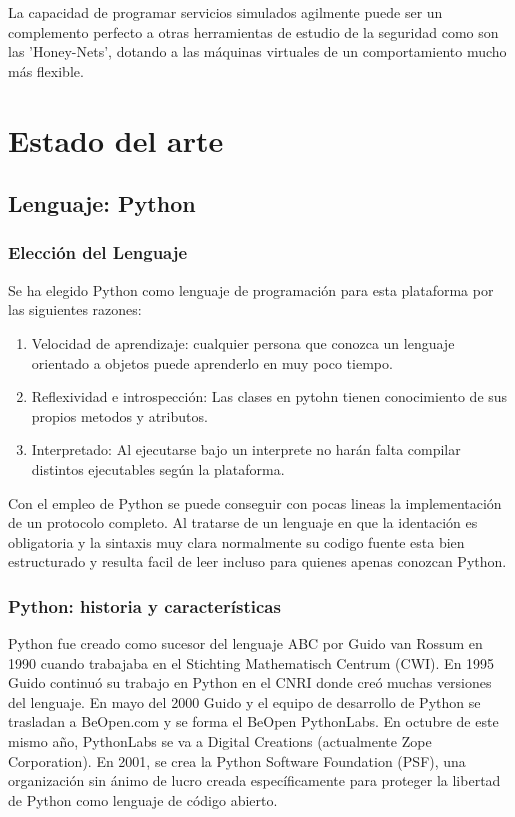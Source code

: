 \documentclass[a4paper,spanish,12pt]{book}
\begin{document}
La capacidad de programar servicios simulados agilmente puede ser un complemento perfecto a otras herramientas de estudio de la seguridad como son las 'Honey-Nets', dotando a las m\'aquinas virtuales de un comportamiento mucho m\'as flexible.



\chapter{Estado del arte}

\section{Lenguaje: Python}
\subsection{Elecci\'on del Lenguaje} 
Se ha elegido Python como lenguaje de programaci\'on para esta plataforma por las siguientes razones:
\begin{enumerate}
	\item Velocidad de aprendizaje: cualquier persona que conozca un lenguaje orientado a objetos puede aprenderlo en muy poco tiempo.
	\item Reflexividad e introspección: Las clases en pytohn tienen conocimiento de sus propios metodos y atributos.
	\item Interpretado: Al ejecutarse bajo un interprete no har\'an falta compilar distintos ejecutables seg\'un la plataforma.
\end{enumerate}

Con el empleo de Python se puede conseguir con pocas lineas la implementaci\'on de un protocolo completo. Al tratarse de un lenguaje en que la identaci\'on es obligatoria y la sintaxis muy clara normalmente su codigo fuente esta bien estructurado y resulta facil de leer incluso para quienes apenas conozcan Python.

\subsection{Python: historia y características}

Python fue creado como sucesor del lenguaje ABC por Guido van Rossum en 1990 cuando trabajaba en el Stichting Mathematisch Centrum (CWI). En 1995 Guido continuó su trabajo en Python en el CNRI donde creó muchas versiones del lenguaje. En mayo del 2000 Guido y el equipo de desarrollo de Python se trasladan a BeOpen.com y se forma el BeOpen PythonLabs. En octubre de este mismo año, PythonLabs se va a Digital Creations (actualmente Zope Corporation). En 2001, se crea la Python Software Foundation (PSF), una organización sin ánimo de lucro creada específicamente para proteger la libertad de Python como lenguaje de código abierto.
\end{document}
